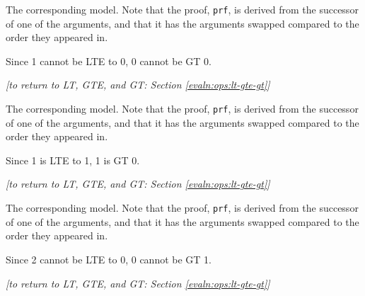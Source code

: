     The corresponding \Idris model. Note that the proof, \texttt{prf}, is derived from the successor of one of the arguments, and that it has the arguments swapped compared to the order they appeared in.
    
    
    Since 1 cannot be LTE to 0, 0 cannot be GT 0.
    \\
    
    \begin{flushright}
        \textit{[to return to LT, GTE, and GT: Section \ref{evaln:ops:lt-gte-gt}]}
    \end{flushright}
    
    \newpage
    
    
    
    The corresponding \Idris model. Note that the proof, \texttt{prf}, is derived from the successor of one of the arguments, and that it has the arguments swapped compared to the order they appeared in.
    
    
    Since 1 is LTE to 1, 1 is GT 0.
    \\
    
    \begin{flushright}
        \textit{[to return to LT, GTE, and GT: Section \ref{evaln:ops:lt-gte-gt}]}
    \end{flushright}
    
    \newpage
    
    
    
    The corresponding \Idris model. Note that the proof, \texttt{prf}, is derived from the successor of one of the arguments, and that it has the arguments swapped compared to the order they appeared in.
    
    
    Since 2 cannot be LTE to 0, 0 cannot be GT 1.
    \\
    
    \begin{flushright}
        \textit{[to return to LT, GTE, and GT: Section \ref{evaln:ops:lt-gte-gt}]}
    \end{flushright}
    
